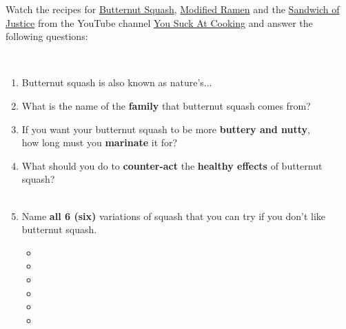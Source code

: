\documentclass[letterpaper,12pt]{article}
\begin{document}

\newcommand{\fillspace}[1]{\null\hfill\myline{#1}}

Watch the recipes for \href{https://www.youtube.com/watch?v=GYl7h8iDjsY}{Butternut Squash}, \href{https://www.youtube.com/watch?v=JsB57FtaxXQ}{Modified Ramen} and the \href{https://www.youtube.com/watch?v=iqhJvadqtAc}{Sandwich of Justice} from the YouTube channel \href{https://www.youtube.com/channel/UCekQr9znsk2vWxBo3YiLq2w}{You Suck At Cooking} and answer the following questions:

\ \\ 


	
\begin{enumerate}[label=(\roman*)] \vspace{-.3in} 
	\setlength{\itemsep}{2em}
	\item Butternut squash is also known as nature's... \fillspace{2in} 
	\item What is the name of the \textbf{family} that butternut squash comes from? \fillspace{2in}
	\item If you want your butternut squash to be more \textbf{buttery and nutty}, \\ how long must you \textbf{marinate} it for? \fillspace{2in}
	\item What should you do to \textbf{counter-act} the \textbf{healthy effects} of butternut squash? \fillspace{1.8in} \\ \ \\ \fillspace{2in}  \pagebreak
	\item Name \textbf{all 6 (six)} variations of squash that you can try if you don't like butternut squash. \ \\
	\begin{itemize}
		\setlength{\itemsep}{1.5em}
		\item \myline{3in}
		\item \myline{3in}
		\item \myline{3in}
		\item \myline{3in}
		\item \myline{3in}
		\item \myline{3in}
	\end{itemize}
\end{enumerate}

\ \\ 
\end{document}
